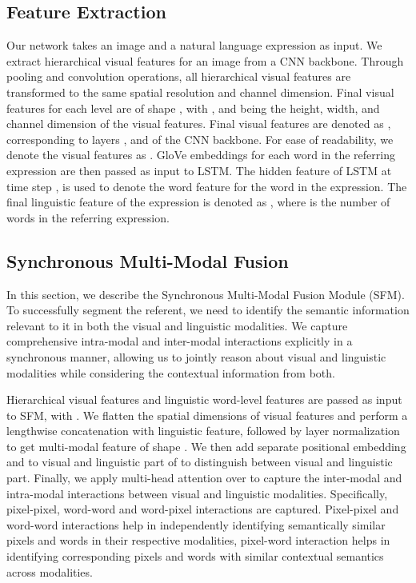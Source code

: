 \documentclass[11pt]{article}
\begin{document}
\subsection{Feature Extraction}



Our network takes an image and a natural language expression as input. We extract hierarchical visual features for an image from a CNN backbone. Through pooling and convolution operations, all hierarchical visual features are transformed to the same spatial resolution and channel dimension. Final visual features for each level are of shape , with ,  and  being the height, width, and channel dimension of the visual features. Final visual features are denoted as , corresponding to layers ,  and  of the CNN backbone. For ease of readability, we denote the visual features as .  GloVe embeddings for each word in the referring expression are then passed as input to LSTM. The hidden feature of LSTM at  time step  , is used to denote the word feature for the  word in the expression. The final linguistic feature of the expression is denoted as , where  is the number of words in the referring expression.

\subsection{Synchronous Multi-Modal Fusion}







In this section, we describe the Synchronous Multi-Modal Fusion Module (SFM). To successfully segment the referent, we need to identify the semantic information relevant to it in both the visual and linguistic modalities. We capture comprehensive intra-modal and inter-modal interactions explicitly in a synchronous manner, allowing us to jointly reason about visual and linguistic modalities while considering the contextual information from both.







Hierarchical visual features  and linguistic word-level features  are passed as input to SFM, with . We flatten the spatial dimensions of visual features and perform a lengthwise concatenation with linguistic feature, followed by layer normalization to get multi-modal feature  of shape . We then add separate positional embedding  and  to visual  and linguistic  part of  to distinguish between visual and linguistic part. Finally, we apply multi-head attention over  to capture the inter-modal and intra-modal interactions between visual and linguistic modalities. Specifically, pixel-pixel, word-word and word-pixel interactions are captured. Pixel-pixel and word-word interactions help in independently identifying semantically similar pixels and words in their respective modalities, pixel-word interaction helps in identifying corresponding pixels and words with similar contextual semantics across modalities.
\end{document}

